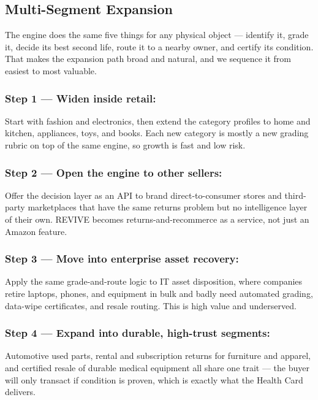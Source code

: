 \documentclass[11pt]{article}
\newcommand{\placeholder}[1]{{\color{placeGray} #1}}
\begin{document}
\subsection{Multi-Segment Expansion}

\placeholder{The engine does the same five things for any physical object --- identify it, grade it, decide its best second life, route it to a nearby owner, and certify its condition. That makes the expansion path broad and natural, and we sequence it from easiest to most valuable.}

\subsubsection*{\color{amznSlate} Step 1 --- Widen inside retail:}
\placeholder{Start with fashion and electronics, then extend the category profiles to home and kitchen, appliances, toys, and books. Each new category is mostly a new grading rubric on top of the same engine, so growth is fast and low risk.}

\subsubsection*{\color{amznSlate} Step 2 --- Open the engine to other sellers:}
\placeholder{Offer the decision layer as an API to brand direct-to-consumer stores and third-party marketplaces that have the same returns problem but no intelligence layer of their own. REVIVE becomes returns-and-recommerce as a service, not just an Amazon feature.}

\subsubsection*{\color{amznSlate} Step 3 --- Move into enterprise asset recovery:}
\placeholder{Apply the same grade-and-route logic to IT asset disposition, where companies retire laptops, phones, and equipment in bulk and badly need automated grading, data-wipe certificates, and resale routing. This is high value and underserved.}

\subsubsection*{\color{amznSlate} Step 4 --- Expand into durable, high-trust segments:}
\placeholder{Automotive used parts, rental and subscription returns for furniture and apparel, and certified resale of durable medical equipment all share one trait --- the buyer will only transact if condition is proven, which is exactly what the Health Card delivers.}
\end{document}
